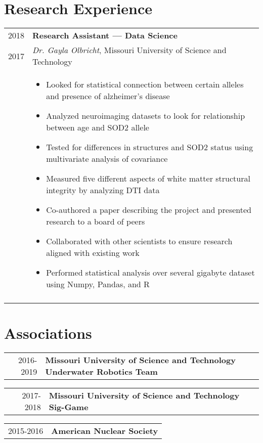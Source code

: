 \documentclass[a4paper,10pt]{article}
\newcommand{\br}{\\\multicolumn{2}{c}{}}
\begin{document}
\section{Research Experience}
\begin{tabular}{r|p{15cm}}
    \textsc{2018} & \textbf{Research Assistant --- Data Science} \\
    \textsc{2017} & \textit{Dr. Gayla Olbricht}, Missouri University of Science and Technology \\ &
    \begin{itemize}
    \item Looked for statistical connection between certain alleles and presence of alzheimer's disease
    \item Analyzed neuroimaging datasets to look for relationship between age and SOD2 allele
    \item Tested for differences in structures and SOD2 status using multivariate analysis of covariance
    \item Measured five different aspects of white matter structural integrity by analyzing DTI data
    \item Co-authored a paper describing the project and presented research to a board of peers
    \item Collaborated with other scientists to ensure research aligned with existing work
    \item Performed statistical analysis over several gigabyte dataset using Numpy, Pandas, and R
    \end{itemize} \br\\

\end{tabular}


\section{Associations}
\begin{tabular}{r|p{15cm}}
  \textsc{2016-2019} & \textbf{Missouri University of Science and Technology Underwater Robotics Team} \\
\end{tabular}

\begin{tabular}{r|p{15cm}}
  \textsc{2017-2018} & \textbf{Missouri University of Science and Technology Sig-Game} \\
\end{tabular}

\begin{tabular}{r|p{15cm}}
  \textsc{2015-2016} & \textbf{American Nuclear Society} \\
\end{tabular}
\end{document}
